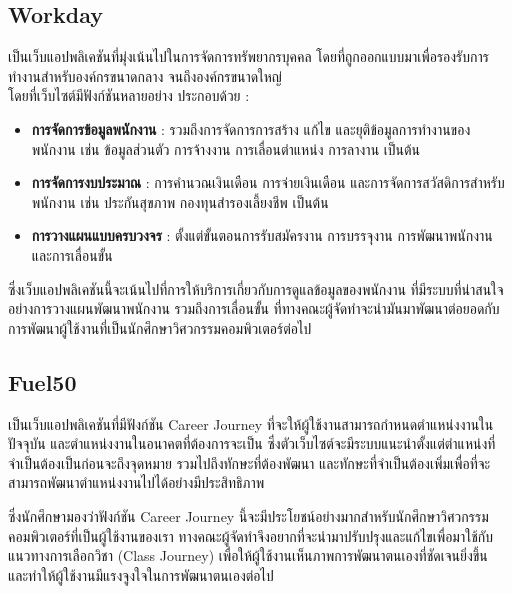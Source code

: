 \subsection{Workday}
เป็นเว็บแอปพลิเคชันที่มุ่งเน้นไปในการจัดการทรัพยากรบุคคล โดยที่ถูกออกแบบมาเพื่อรองรับการทำงานสำหรับองค์กรขนาดกลาง จนถึงองค์กรขนาดใหญ่ \\
โดยที่เว็บไซต์มีฟังก์ชันหลายอย่าง ประกอบด้วย :
\begin{itemize}
      \item \textbf{การจัดการข้อมูลพนักงาน} : รวมถึงการจัดการการสร้าง แก้ไข และยุติข้อมูลการทำงานของพนักงาน เช่น ข้อมูลส่วนตัว การจ้างงาน การเลื่อนตำแหน่ง การลางาน เป็นต้น
      \item \textbf{การจัดการงบประมาณ} : การคำนวณเงินเดือน การจ่ายเงินเดือน และการจัดการสวัสดิการสำหรับพนักงาน เช่น ประกันสุขภาพ กองทุนสำรองเลี้ยงชีพ เป็นต้น
      \item \textbf{การวางแผนแบบครบวงจร} : ตั้งแต่ขั้นตอนการรับสมัครงาน การบรรจุงาน การพัฒนาพนักงาน และการเลื่อนขั้น
\end{itemize}
\par ซึ่งเว็บแอปพลิเคชันนี้จะเน้นไปที่การให้บริการเกี่ยวกับการดูแลข้อมูลของพนักงาน ที่มีระบบที่น่าสนใจอย่างการวางแผนพัฒนาพนักงาน
รวมถึงการเลื่อนขั้น ที่ทางคณะผู้จัดทำจะนำมันมาพัฒนาต่อยอดกับการพัฒนาผู้ใช้งานที่เป็นนักศึกษาวิศวกรรมคอมพิวเตอร์ต่อไป

\subsection{Fuel50}
เป็นเว็บแอปพลิเคชันที่มีฟังก์ชัน Career Journey ที่จะให้ผู้ใช้งานสามารถกำหนดตำแหน่งงานในปัจจุบัน และตำแหน่งงานในอนาคตที่ต้องการจะเป็น
ซึ่งตัวเว็บไซต์จะมีระบบแนะนำตั้งแต่ตำแหน่งที่จำเป็นต้องเป็นก่อนจะถึงจุดหมาย รวมไปถึงทักษะที่ต้องพัฒนา
และทักษะที่จำเป็นต้องเพิ่มเพื่อที่จะสามารถพัฒนาตำแหน่งงานไปได้อย่างมีประสิทธิภาพ
\par ซึ่งนักศึกษามองว่าฟังก์ชัน Career Journey นี้จะมีประโยชน์อย่างมากสำหรับนักศึกษาวิศวกรรมคอมพิวเตอร์ที่เป็นผู้ใช้งานของเรา
ทางคณะผู้จัดทำจึงอยากที่จะนำมาปรับปรุงและแก้ไขเพื่อมาใช้กับแนวทางการเลือกวิชา (Class Journey) เพื่อให้ผู้ใช้งานเห็นภาพการพัฒนาตนเองที่ชัดเจนยิ่งขึ้น
และทำให้ผู้ใช้งานมีแรงจูงใจในการพัฒนาตนเองต่อไป

